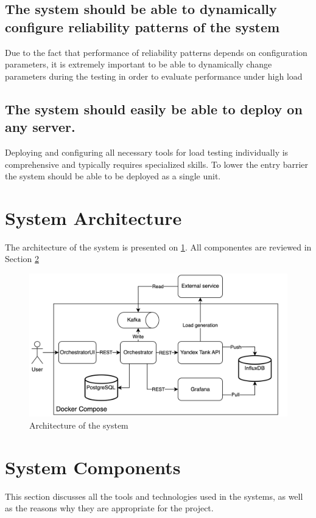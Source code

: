 \subsection{The system should be able to dynamically configure reliability patterns of the system}\label{subsec:req-configure}
Due to the fact that performance of reliability patterns depends on configuration parameters, it is extremely important to be able to dynamically change parameters during the testing in order to evaluate performance under high load

\subsection{The system should easily be able to deploy on any server.}\label{subsec:req-deploy}
Deploying and configuring all necessary tools for load testing individually is comprehensive and typically requires specialized skills. To lower the entry barrier the system should be able to be deployed as a single unit.


\section{System Architecture}\label{sec:system-architecture}
The architecture of the system is presented on \ref{fig:architecture}. All componentes are reviewed in Section \ref{sec:system-components}

\begin{figure}[t]
    \centering
    \includegraphics[height=\textheight,width=\textwidth,keepaspectratio]{architecture.png}
    \caption{Architecture of the system}
    \label{fig:architecture}
\end{figure}

\section{System Components}\label{sec:system-components}
This section discusses all the tools and technologies used in the systems, as well as the reasons why they are appropriate for the project.
